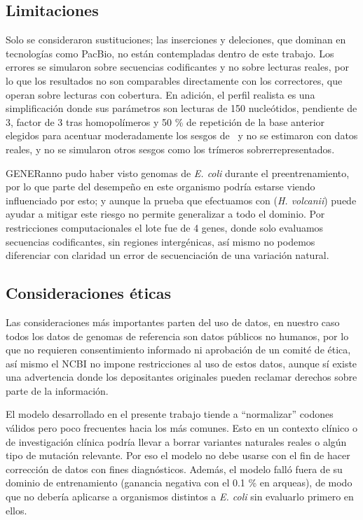 \documentclass[sigconf,nonacm]{acmart}
\begin{document}
\subsection{Limitaciones}\label{sec:limitaciones}

Solo se consideraron sustituciones; las inserciones y deleciones, que dominan en tecnologías como PacBio, no están contempladas dentro de este trabajo. Los errores se simularon sobre secuencias codificantes y no sobre lecturas reales, por lo que los resultados no son comparables directamente con los correctores, que operan sobre lecturas con cobertura. En adición, el perfil realista es una simplificación donde sus parámetros son lecturas de 150 nucleótidos, pendiente de 3, factor de 3 tras homopolímeros y 50 \% de repetición de la base anterior elegidos para acentuar moderadamente los sesgos de~\cite{stoler2021sequencing} y no se estimaron con datos reales, y no se simularon otros sesgos como los trímeros sobrerrepresentados.

GENERanno pudo haber visto genomas de \emph{E. coli} durante el preentrenamiento, por lo que parte del desempeño en este organismo podría estarse viendo influenciado por esto; y aunque la prueba que efectuamos con (\emph{H. volcanii}) puede ayudar a mitigar este riesgo no permite generalizar a todo el dominio. Por restricciones computacionales el lote fue de 4 genes, donde solo evaluamos secuencias codificantes, sin regiones intergénicas, así mismo no podemos diferenciar con claridad un error de secuenciación de una variación natural.

\subsection{Consideraciones éticas}\label{sec:etica}

Las consideraciones más importantes parten del uso de datos, en nuestro caso todos los datos de genomas de referencia son datos públicos no humanos, por lo que no requieren consentimiento informado ni aprobación de un comité de ética, así mismo el NCBI no impone restricciones al uso de estos datos, aunque sí existe una advertencia donde los depositantes originales pueden reclamar derechos sobre parte de la información.

El modelo desarrollado en el presente trabajo tiende a ``normalizar'' codones válidos pero poco frecuentes hacia los más comunes. Esto en un contexto clínico o de investigación clínica podría llevar a borrar variantes naturales reales o algún tipo de mutación relevante. Por eso el modelo no debe usarse con el fin de hacer corrección de datos con fines diagnósticos. Además, el modelo falló fuera de su dominio de entrenamiento (ganancia negativa con el 0.1 \% en arqueas), de modo que no debería aplicarse a organismos distintos a \emph{E. coli} sin evaluarlo primero en ellos.
\end{document}
